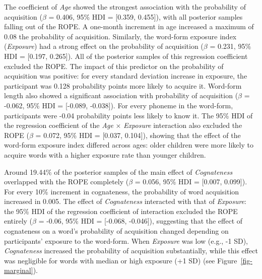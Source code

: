 \documentclass[
]{article}
\begin{document}
The coefficient of \emph{Age} showed the strongest association with the
probability of acquisition (\(\beta\) = 0.406, 95\% HDI = {[}0.359,
0.455{]}), with all posterior samples falling out of the ROPE. A
one-month increment in age increased a maximum of 0.08 the probability
of acquisition. Similarly, the word-form exposure index
(\emph{Exposure}) had a strong effect on the probability of acquisition
(\(\beta\) = 0.231, 95\% HDI = {[}0.197, 0.265{]}). All of the posterior
samples of this regression coefficient excluded the ROPE. The impact of
this predictor on the probability of acquisition was positive: for every
standard deviation increase in exposure, the participant was 0.128
probability points more likely to acquire it. Word-form length also
showed a significant association with probability of acquisition
(\(\beta\) = -0.062, 95\% HDI = {[}-0.089, -0.038{]}). For every phoneme
in the word-form, participants were -0.04 probability points less likely
to know it. The 95\% HDI of the regression coefficient of the \emph{Age}
\(\times\) \emph{Exposure} interaction also excluded the ROPE (\(\beta\)
= 0.072, 95\% HDI = {[}0.037, 0.104{]}), showing that the effect of the
word-form exposure index differed across ages: older children were more
likely to acquire words with a higher exposure rate than younger
children.

Around 19.44\% of the posterior samples of the main effect of
\emph{Cognateness} overlapped with the ROPE completely (\(\beta\) =
0.056, 95\% HDI = {[}0.007, 0.099{]}). For every 10\% increment in
cognateness, the probability of word acquisition increased in 0.005. The
effect of \emph{Cognateness} interacted with that of \emph{Exposure}:
the 95\% HDI of the regression coefficient of interaction excluded the
ROPE entirely (\(\beta\) = -0.06, 95\% HDI = {[}-0.068, -0.046{]}),
suggesting that the effect of cognateness on a word's probability of
acquisition changed depending on participants' exposure to the
word-form. When \emph{Exposure} was low (e.g., -1 SD),
\emph{Cognateness} increased the probability of acquisition
substantially, while this effect was negligible for words with median or
high exposure (+1 SD) (see Figure~\ref{fig-marginal}).
\end{document}
